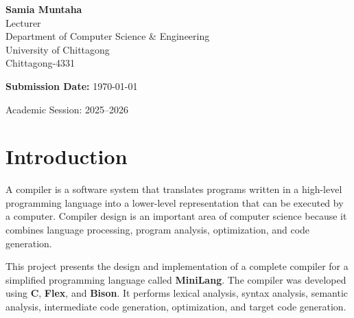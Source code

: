 \documentclass[12pt,a4paper]{report}
\begin{document}
\begin{titlepage}
\begin{center}
\vspace{0.8cm}

\begin{tcolorbox}[
colback=green!5,
colframe=success,
width=0.9\textwidth,
title=\textbf{Course Teacher}
]

\centering

\textbf{Samia Muntaha}\\
Lecturer\\
Department of Computer Science \& Engineering\\
University of Chittagong\\
Chittagong-4331

\end{tcolorbox}

\vfill

{\large
\textbf{Submission Date:} \today
}

\vspace{0.5cm}

{\large Academic Session: 2025--2026}

\end{center}

\end{titlepage}



\tableofcontents
\newpage

\listoffigures
\newpage

\listoftables
\newpage




\chapter{Introduction}

A compiler is a software system that translates programs written in a high-level programming language into a lower-level representation that can be executed by a computer. Compiler design is an important area of computer science because it combines language processing, program analysis, optimization, and code generation.

This project presents the design and implementation of a complete compiler for a simplified programming language called \textbf{MiniLang}. The compiler was developed using \textbf{C}, \textbf{Flex}, and \textbf{Bison}. It performs lexical analysis, syntax analysis, semantic analysis, intermediate code generation, optimization, and target code generation.
\end{document}
